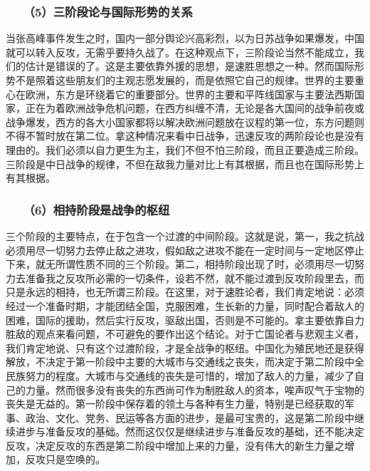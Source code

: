 \documentclass[cn,11pt,chinese]{elegantbook}
\def\myformat#1{\hfil\hfil #1}
\begin{document}
\subsubsection*{\myformat{　　（5）三阶段论与国际形势的关系}}
当张高峰事件发生之时，国内一部分舆论兴高彩烈，以为日苏战争如果爆发，中国就可以转入反攻，无需乎要持久战了。在这种观点下，三阶段论当然不能成立，我们的估计是错误的了。这是主要依靠外援的思想，是速胜思想之一种。然而国际形势不是照着这些朋友们的主观志愿发展的，而是依照它自己的规律。世界的主要重心在欧洲，东方是环绕着它的重要部分。世界的主要和平阵线国家与主要法西斯国家，正在为着欧洲战争危机问题，在西方纠缠不清，无论是各大国间的战争前夜或战争爆发，西方的各大小国家都将以解决欧洲问题放在议程的第一位，东方问题则不得不暂时放在第二位。拿这种情况来看中日战争，迅速反攻的两阶段论也是没有理由的。我们必须以自力更生为主，我们不但不怕三阶段，而且正要造成三阶段。三阶段是中日战争的规律，不但在敌我力量对比上有其根据，而且也在国际形势上有其根据。\\
\subsubsection*{\myformat{　　（6）相持阶段是战争的枢纽}}
三个阶段的主要特点，在于包含一个过渡的中间阶段。这就是说，第一，我之抗战必须用尽一切努力去停止敌之进攻，假如敌之进攻不能在一定时间与一定地区停止下来，就无所谓性质不同的三个阶段。第二，相持阶段出现了时，必须用尽一切努力去准备我之反攻所必需的一切条件，设若不然，就不能过渡到反攻阶段里去，而只是永远的相持，也无所谓三阶段。在这里，对于速胜论者，我们肯定地说：必须经过一个准备时期，才能团结全国，克服困难，生长新的力量，同时配合着敌人的困难，国际的援助，然后实行反攻，驱敌出国，否则是不可能的。拿主要依靠自力胜敌的观点来看问题，不可避免的要作出这个结论。对于亡国论者与悲观主义者，我们肯定地说、只有这个过渡阶段，才是全战争的枢纽。中国化为殖民地还是获得解放，不决定于第一阶段中主要的大城市与交通线之丧失，而决定于第二阶段中全民族努力的程度。大城市与交通线的丧失是可惜的，增加了敌人的力量，减少了自己的力量。然而很多没有丧失的东西尚可作为制胜敌人的资本，唉声叹气于宝物的丧失是无益的。第一阶段中保存着的领土与各种有生力量，特别是已经获取的军事、政治、文化、党务、民运等各方面的进步，是最可宝贵的，这是第二阶段中继续进步与准备反攻的基础。然而这仅仅是继续进步与准备反攻的基础，还不能决定反攻，决定反攻的东西是第二阶段中增加上来的力量，没有伟大的新生力量之增加，反攻只是空唤的。\\
\end{document}
